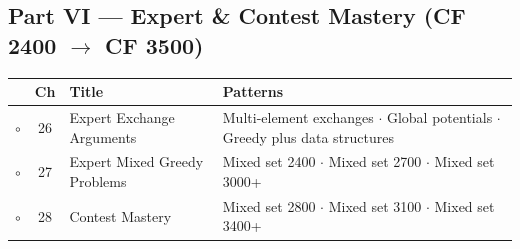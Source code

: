 \subsection*{Part VI --- Expert \& Contest Mastery (CF 2400 $\to$ CF 3500)}
\begin{tabularx}{\linewidth}{@{}c c >{\raggedright\arraybackslash}p{3.6cm} X@{}}
\toprule
& \textbf{Ch} & \textbf{Title} & \textbf{Patterns} \\
\midrule
$\circ$ & 26 & Expert Exchange Arguments & Multi-element exchanges $\cdot$ Global potentials $\cdot$ Greedy plus data structures \\
$\circ$ & 27 & Expert Mixed Greedy Problems & Mixed set 2400 $\cdot$ Mixed set 2700 $\cdot$ Mixed set 3000+ \\
$\circ$ & 28 & Contest Mastery & Mixed set 2800 $\cdot$ Mixed set 3100 $\cdot$ Mixed set 3400+ \\
\bottomrule
\end{tabularx}
\endgroup
